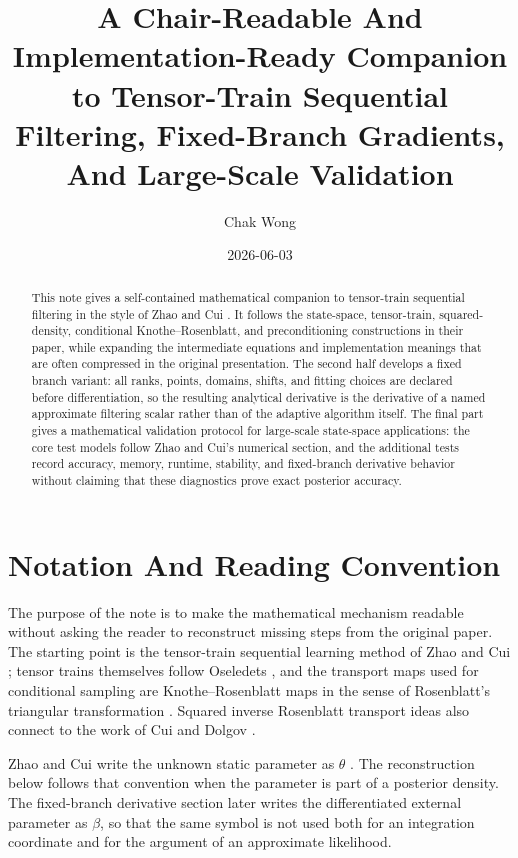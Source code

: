 \documentclass[11pt]{article}
\title{A Chair-Readable And Implementation-Ready Companion to Tensor-Train Sequential Filtering, Fixed-Branch Gradients, And Large-Scale Validation}
\author{Chak Wong}
\date{2026-06-03}
\numberwithin{equation}{section}
\begin{document}
\maketitle

\begin{abstract}
This note gives a self-contained mathematical companion to tensor-train
sequential filtering in the style of Zhao and Cui \cite{zhao2024ttsequential}.
It follows the state-space, tensor-train, squared-density, conditional
Knothe--Rosenblatt, and preconditioning constructions in their paper, while
expanding the intermediate equations and implementation meanings that are often
compressed in the original presentation.  The second half develops a fixed
branch variant: all ranks, points, domains, shifts, and fitting choices are
declared before differentiation, so the resulting analytical derivative is the
derivative of a named approximate filtering scalar rather than of the adaptive
algorithm itself.  The final part gives a mathematical validation protocol for
large-scale state-space applications: the core test models follow Zhao and
Cui's numerical section, and the additional tests record accuracy, memory,
runtime, stability, and fixed-branch derivative behavior without claiming that
these diagnostics prove exact posterior accuracy.
\end{abstract}

\tableofcontents

\section{Notation And Reading Convention}

The purpose of the note is to make the mathematical mechanism readable without
asking the reader to reconstruct missing steps from the original paper.  The
starting point is the tensor-train sequential learning method of Zhao and Cui
\cite{zhao2024ttsequential}; tensor trains themselves follow Oseledets
\cite{oseledets2011tt}, and the transport maps used for conditional sampling
are Knothe--Rosenblatt maps in the sense of Rosenblatt's triangular
transformation \cite{rosenblatt1952remarks}.  Squared inverse Rosenblatt
transport ideas also connect to the work of Cui and Dolgov
\cite{cui2021deep}.

Zhao and Cui write the unknown static parameter as \(\theta\)
\cite{zhao2024ttsequential}.  The reconstruction below follows that convention
when the parameter is part of a posterior density.  The fixed-branch derivative
section later writes the differentiated external parameter as \(\beta\), so
that the same symbol is not used both for an integration coordinate and for the
argument of an approximate likelihood.
\end{document}
